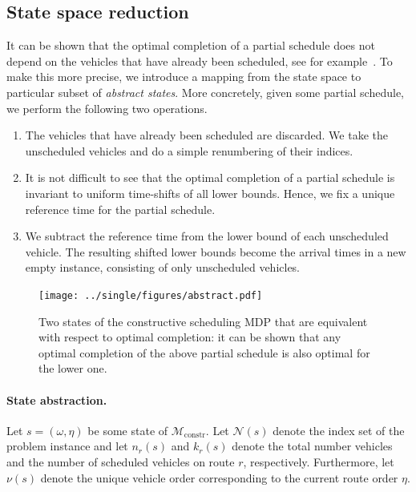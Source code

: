 \documentclass[a4paper]{report}
\theoremstyle{definition}
\theoremstyle{plain}
\begin{document}
\subsection{State space reduction}

It can be shown that the optimal completion of a partial schedule does not
depend on the vehicles that have already been scheduled, see for
example~.
%
To make this more precise, we introduce a mapping from the state space to
particular subset of \emph{abstract states}.
%
More concretely, given some partial schedule, we perform the following two
operations.
\begin{enumerate}
  \item The vehicles that have already been scheduled are discarded. We take the
        unscheduled vehicles and do a simple renumbering of their indices.
  \item It is not difficult to see that the optimal completion of a partial
        schedule is invariant to uniform time-shifts of all lower bounds.
        Hence, we fix a unique reference time for the partial schedule.

  \item We subtract the reference time from the lower bound of each unscheduled
        vehicle. The resulting shifted lower bounds become the arrival times in
        a new empty instance, consisting of only unscheduled vehicles.
\end{enumerate}

\begin{figure}
  \centering
  \texttt{[image: ../single/figures/abstract.pdf]}
  \caption{Two states of the constructive scheduling MDP that are equivalent
    with respect to optimal completion: it can be shown that any optimal
    completion of the above partial schedule is also optimal for the lower
    one.}%
  \label{fig:abstract}
\end{figure}

\paragraph{State abstraction.}
Let $s = (\omega, \eta)$ be some state of $\mathcal{M}_\mathrm{constr}$.
Let $\mathcal{N}(s)$ denote the index set of the problem instance and let
$n_r(s)$ and $k_r(s)$ denote the total number vehicles and the number of
scheduled vehicles on route $r$, respectively. Furthermore, let $\nu(s)$ denote
the unique vehicle order corresponding to the current route order $\eta$.
\end{document}
